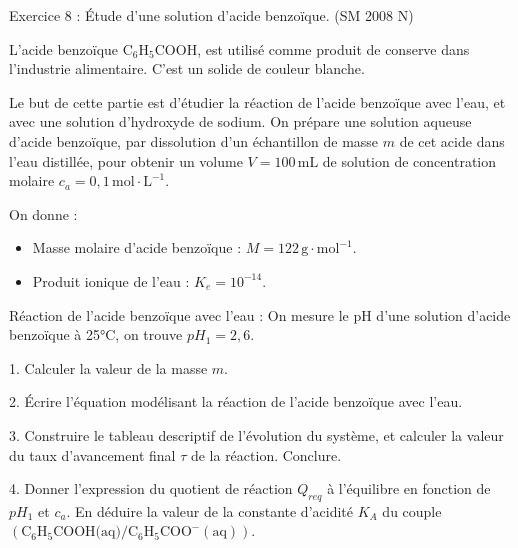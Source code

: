 \documentclass[12pt, french]{article}
\begin{document}
\begin{Box2}{Exercice 8 : Étude d’une solution d’acide benzoïque. (SM 2008 N)}

L’acide benzoïque $\text{C}_6 \text{H}_5 \text{COOH}$, est utilisé comme produit de conserve dans l’industrie alimentaire. C’est un solide de couleur blanche.

Le but de cette partie est d’étudier la réaction de l’acide benzoïque avec l’eau, et avec une solution d’hydroxyde de sodium. On prépare une solution aqueuse d’acide benzoïque, par dissolution d’un échantillon de masse $m$ de cet acide dans l’eau distillée, pour obtenir un volume $V = 100 \, \text{mL}$ de solution de concentration molaire $c_a = 0,1 \, \text{mol} \cdot \text{L}^{-1}$.

On donne :
\begin{itemize}
    \item Masse molaire d’acide benzoïque : $M = 122 \, \text{g} \cdot \text{mol}^{-1}$.
    \item Produit ionique de l’eau : $K_e = 10^{-14}$.
\end{itemize}

Réaction de l’acide benzoïque avec l’eau :  
On mesure le pH d’une solution d’acide benzoïque à 25°C, on trouve $pH_1 = 2,6$.

1. Calculer la valeur de la masse $m$.
  
2. Écrire l’équation modélisant la réaction de l’acide benzoïque avec l’eau.

3. Construire le tableau descriptif de l’évolution du système, et calculer la valeur du taux d’avancement final $\tau$ de la réaction. Conclure.

4. Donner l’expression du quotient de réaction $Q_{req}$ à l’équilibre en fonction de $pH_1$ et $c_a$. En déduire la valeur de la constante d’acidité $K_A$ du couple $\left( \text{C}_6 \text{H}_5 \text{COOH(aq)} / \text{C}_6 \text{H}_5 \text{COO}^- (\text{aq}) \right)$.
\end{Box2}
\end{document}
